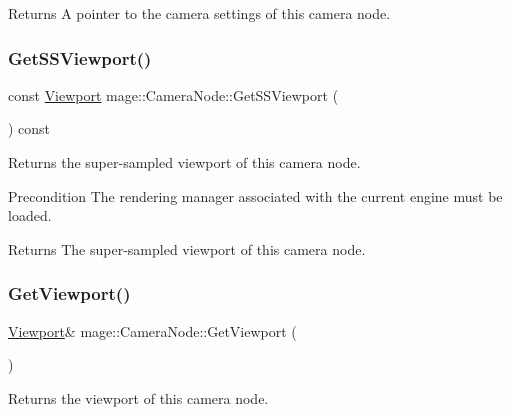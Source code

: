 \begin{DoxyReturn}{Returns}
A pointer to the camera settings of this camera node. 
\end{DoxyReturn}
\hypertarget{classmage_1_1_camera_node_a1280c0c2735869d8703b67322f13b3cc}{}\label{classmage_1_1_camera_node_a1280c0c2735869d8703b67322f13b3cc} 
\subsubsection{\texorpdfstring{Get\+S\+S\+Viewport()}{GetSSViewport()}}
{\footnotesize\ttfamily const \hyperlink{classmage_1_1_viewport}{Viewport} mage\+::\+Camera\+Node\+::\+Get\+S\+S\+Viewport (\begin{DoxyParamCaption}{ }\end{DoxyParamCaption}) const\hspace{0.3cm}{\ttfamily [noexcept]}}

Returns the super-\/sampled viewport of this camera node.

\begin{DoxyPrecond}{Precondition}
The rendering manager associated with the current engine must be loaded. 
\end{DoxyPrecond}
\begin{DoxyReturn}{Returns}
The super-\/sampled viewport of this camera node. 
\end{DoxyReturn}
\hypertarget{classmage_1_1_camera_node_ac280168901be6f8bdf03300f0b8c1a69}{}\label{classmage_1_1_camera_node_ac280168901be6f8bdf03300f0b8c1a69} 
\subsubsection{\texorpdfstring{Get\+Viewport()}{GetViewport()}\hspace{0.1cm}{\footnotesize\ttfamily [1/2]}}
{\footnotesize\ttfamily \hyperlink{classmage_1_1_viewport}{Viewport}\& mage\+::\+Camera\+Node\+::\+Get\+Viewport (\begin{DoxyParamCaption}{ }\end{DoxyParamCaption})\hspace{0.3cm}{\ttfamily [noexcept]}}

Returns the viewport of this camera node.


